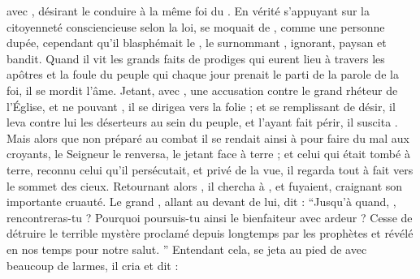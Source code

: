  avec , désirant le conduire à la même foi du .  %
En vérité  s'appuyant sur la citoyenneté consciencieuse  selon la loi,
se moquait de , comme une personne dupée, 
cependant qu'il blasphémait le , le surnommant , ignorant, paysan et bandit. %
Quand il vit les  grands faits de prodiges qui eurent lieu à travers les apôtres et la foule du peuple qui  chaque jour prenait le parti de la parole de la foi, il se mordit l'âme. 
Jetant, avec , une accusation contre  le grand rhéteur de l'Église, et ne pouvant , il se dirigea vers la folie ;
et se remplissant de désir, il leva contre lui les déserteurs au sein du peuple, et l'ayant fait périr, il suscita . %
Mais alors que non préparé au combat il se rendait ainsi à  pour faire du mal aux croyants, le Seigneur le renversa, le jetant face à terre ; et celui qui était tombé à terre, reconnu celui qu'il persécutait, et privé de la vue, il regarda tout à fait vers le sommet des cieux.
Retournant alors , il chercha à , et   fuyaient, craignant son importante cruauté. %
Le grand ,  allant au devant de lui, dit :
\enquote{Jusqu'à quand, , rencontreras-tu  ?
Pourquoi poursuis-tu ainsi le bienfaiteur  avec ardeur ?
Cesse de détruire le terrible mystère proclamé depuis longtemps par les prophètes et révélé en nos temps pour notre salut.
}
Entendant cela,  se jeta au pied de  avec beaucoup de larmes, il cria et dit :
